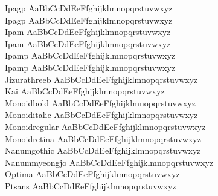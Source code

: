 \begin{tabbing}
Ipagp \> { AaBbCcDdEeFfghijklmnopqrstuvwxyz} \\
Ipagp \> { AaBbCcDdEeFfghijklmnopqrstuvwxyz} \\
Ipam \> { AaBbCcDdEeFfghijklmnopqrstuvwxyz} \\
Ipam \> { AaBbCcDdEeFfghijklmnopqrstuvwxyz} \\
Ipamp \> { AaBbCcDdEeFfghijklmnopqrstuvwxyz} \\
Ipamp \> { AaBbCcDdEeFfghijklmnopqrstuvwxyz} \\
Jizurathreeb \> { AaBbCcDdEeFfghijklmnopqrstuvwxyz} \\
Kai \> { AaBbCcDdEeFfghijklmnopqrstuvwxyz} \\
Monoidbold \> { AaBbCcDdEeFfghijklmnopqrstuvwxyz} \\
Monoiditalic \> { AaBbCcDdEeFfghijklmnopqrstuvwxyz} \\
Monoidregular \> { AaBbCcDdEeFfghijklmnopqrstuvwxyz} \\
Monoidretina \> { AaBbCcDdEeFfghijklmnopqrstuvwxyz} \\
Nanumgothic \> { AaBbCcDdEeFfghijklmnopqrstuvwxyz} \\
Nanummyeongjo \> { AaBbCcDdEeFfghijklmnopqrstuvwxyz} \\
Optima \> { AaBbCcDdEeFfghijklmnopqrstuvwxyz} \\
Ptsans \> { AaBbCcDdEeFfghijklmnopqrstuvwxyz} \\

\end{tabbing}
